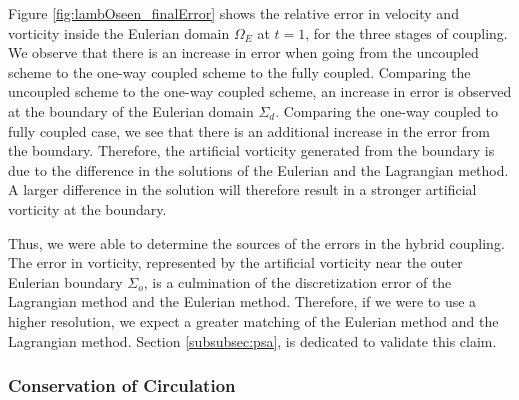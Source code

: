 Figure \ref{fig:lambOseen_finalError} shows the relative error in velocity and vorticity inside the Eulerian domain $\Omega_E$ at $t=1$, for the three stages of coupling. We observe that there is an increase in error when going from the uncoupled scheme to the one-way coupled scheme to the fully coupled. Comparing the uncoupled scheme to the one-way coupled scheme, an increase in error is observed at the boundary of the Eulerian domain $\Sigma_d$.  Comparing the one-way coupled to fully coupled case, we see that there is an additional increase in the error from the boundary. Therefore, the artificial vorticity generated from the boundary is due to the difference in the solutions of the Eulerian and the Lagrangian method. A larger difference in the solution will therefore result in a stronger artificial vorticity at the boundary.

Thus, we were able to determine the sources of the errors in the hybrid coupling. The error in vorticity, represented by the artificial vorticity near the outer Eulerian boundary $\Sigma_o$, is a culmination of the discretization error of the Lagrangian method and the Eulerian method. Therefore, if we were to use a higher resolution, we expect a greater matching of the Eulerian method and the Lagrangian method. Section \ref{subsubsec:psa}, is dedicated to validate this claim.



\subsubsection{Conservation of Circulation}
\label{subsubsec:coc}

